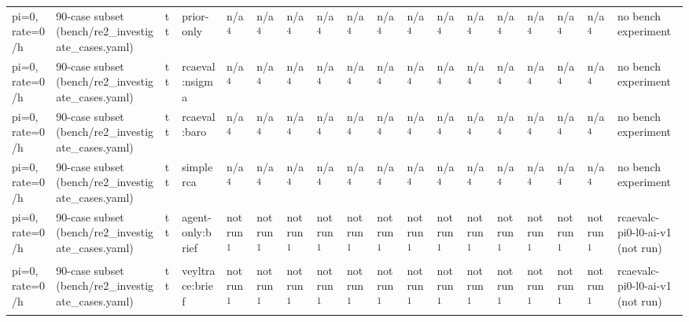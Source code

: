 \begin{table}[t]
\begin{tabular}{llllllllllllllllll}
pi=0, rate=0/h & 90-case subset (bench/re2\_investigate\_cases.yaml) & tt & prior-only & n/a\textsuperscript{4} & n/a\textsuperscript{4} & n/a\textsuperscript{4} & n/a\textsuperscript{4} & n/a\textsuperscript{4} & n/a\textsuperscript{4} & n/a\textsuperscript{4} & n/a\textsuperscript{4} & n/a\textsuperscript{4} & n/a\textsuperscript{4} & n/a\textsuperscript{4} & n/a\textsuperscript{4} & n/a\textsuperscript{4} & no bench experiment \\
pi=0, rate=0/h & 90-case subset (bench/re2\_investigate\_cases.yaml) & tt & rcaeval:nsigma & n/a\textsuperscript{4} & n/a\textsuperscript{4} & n/a\textsuperscript{4} & n/a\textsuperscript{4} & n/a\textsuperscript{4} & n/a\textsuperscript{4} & n/a\textsuperscript{4} & n/a\textsuperscript{4} & n/a\textsuperscript{4} & n/a\textsuperscript{4} & n/a\textsuperscript{4} & n/a\textsuperscript{4} & n/a\textsuperscript{4} & no bench experiment \\
pi=0, rate=0/h & 90-case subset (bench/re2\_investigate\_cases.yaml) & tt & rcaeval:baro & n/a\textsuperscript{4} & n/a\textsuperscript{4} & n/a\textsuperscript{4} & n/a\textsuperscript{4} & n/a\textsuperscript{4} & n/a\textsuperscript{4} & n/a\textsuperscript{4} & n/a\textsuperscript{4} & n/a\textsuperscript{4} & n/a\textsuperscript{4} & n/a\textsuperscript{4} & n/a\textsuperscript{4} & n/a\textsuperscript{4} & no bench experiment \\
pi=0, rate=0/h & 90-case subset (bench/re2\_investigate\_cases.yaml) & tt & simplerca & n/a\textsuperscript{4} & n/a\textsuperscript{4} & n/a\textsuperscript{4} & n/a\textsuperscript{4} & n/a\textsuperscript{4} & n/a\textsuperscript{4} & n/a\textsuperscript{4} & n/a\textsuperscript{4} & n/a\textsuperscript{4} & n/a\textsuperscript{4} & n/a\textsuperscript{4} & n/a\textsuperscript{4} & n/a\textsuperscript{4} & no bench experiment \\
pi=0, rate=0/h & 90-case subset (bench/re2\_investigate\_cases.yaml) & tt & agent-only:brief & not run\textsuperscript{1} & not run\textsuperscript{1} & not run\textsuperscript{1} & not run\textsuperscript{1} & not run\textsuperscript{1} & not run\textsuperscript{1} & not run\textsuperscript{1} & not run\textsuperscript{1} & not run\textsuperscript{1} & not run\textsuperscript{1} & not run\textsuperscript{1} & not run\textsuperscript{1} & not run\textsuperscript{1} & rcaevalc-pi0-l0-ai-v1 (not run) \\
pi=0, rate=0/h & 90-case subset (bench/re2\_investigate\_cases.yaml) & tt & veyltrace:brief & not run\textsuperscript{1} & not run\textsuperscript{1} & not run\textsuperscript{1} & not run\textsuperscript{1} & not run\textsuperscript{1} & not run\textsuperscript{1} & not run\textsuperscript{1} & not run\textsuperscript{1} & not run\textsuperscript{1} & not run\textsuperscript{1} & not run\textsuperscript{1} & not run\textsuperscript{1} & not run\textsuperscript{1} & rcaevalc-pi0-l0-ai-v1 (not run) \\

\end{tabular}
\end{table}
